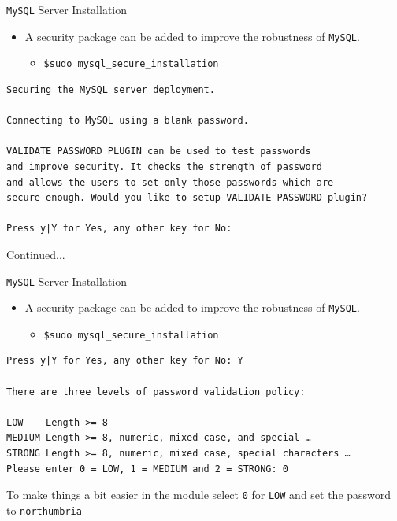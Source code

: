 \documentclass[xcolor=table]{beamer}
\begin{document}
\begin{frame}[fragile]{\texttt{MySQL} Server Installation}
  \begin{itemize}
    \item A security package can be added to improve the robustness of \texttt{MySQL}.
    \begin{itemize}
      \item \texttt{\$sudo mysql\_secure\_installation}
    \end{itemize}
  \end{itemize}
  \begin{tcolorbox}
    \lstset{
      basicstyle=\tiny\ttfamily,
    }
    \begin{lstlisting}
Securing the MySQL server deployment.
    
Connecting to MySQL using a blank password.
      
VALIDATE PASSWORD PLUGIN can be used to test passwords
and improve security. It checks the strength of password
and allows the users to set only those passwords which are
secure enough. Would you like to setup VALIDATE PASSWORD plugin?
      
Press y|Y for Yes, any other key for No:
    \end{lstlisting}
  \end{tcolorbox}
Continued...
\end{frame}

\begin{frame}[fragile]{\texttt{MySQL} Server Installation}
  \begin{itemize}
    \item A security package can be added to improve the robustness of \texttt{MySQL}.
    \begin{itemize}
      \item \texttt{\$sudo mysql\_secure\_installation}
    \end{itemize}
  \end{itemize}
  \begin{tcolorbox}
    \lstset{
      basicstyle=\tiny\ttfamily,
    }
    \begin{lstlisting}
Press y|Y for Yes, any other key for No: Y

There are three levels of password validation policy:
      
LOW    Length >= 8
MEDIUM Length >= 8, numeric, mixed case, and special …
STRONG Length >= 8, numeric, mixed case, special characters …
Please enter 0 = LOW, 1 = MEDIUM and 2 = STRONG: 0
    \end{lstlisting}
  \end{tcolorbox}
  \begin{tcolorbox}
    To make things a bit easier in the module select \texttt{0} for \texttt{LOW} and set the password to \texttt{northumbria}
  \end{tcolorbox}
\end{frame}
\end{document}
